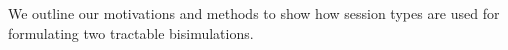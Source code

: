 \begin{comment}
A well-known feature in process calculi is \emph{polyadicity}, i.e.,  
passing around tuples of values in communications. 
We consider the polyadic extension of \HOp, denoted \pHOp.
In \pHOp we have polyadicity in session communications and abstractions; 
polyadicity of shared names is ruled out by typing. 
This is enough for most purposes, including our encoding from \HOp into \HO.
In a session-typed setting, encoding polyadicity is straightforward, thanks to 
the private character of 
(linear) session names --- see \S\,\ref{subsec:pho} for details.

\smallskip

\myparagraph{A Non Encodability Result.}
We also show that shared names strictly add expressiveness to session calculi: that is,
there are (non deterministic) behaviours expressible with shared names not expressible using linear names only.
Although somewhat expected we do not know of a formal proof.
We propose such a formal proof, which relies crucially on the behavioural theory that we have introduced here
and on its determinacy properties. %


\subsection{Tractable Bisimilarities for Session-Typed Processes}
\end{comment}

\label{subsec:intro:bisimulation}
\noi 
We outline our motivations and methods 
to show how session types are used for formulating 
two tractable bisimulations. 

